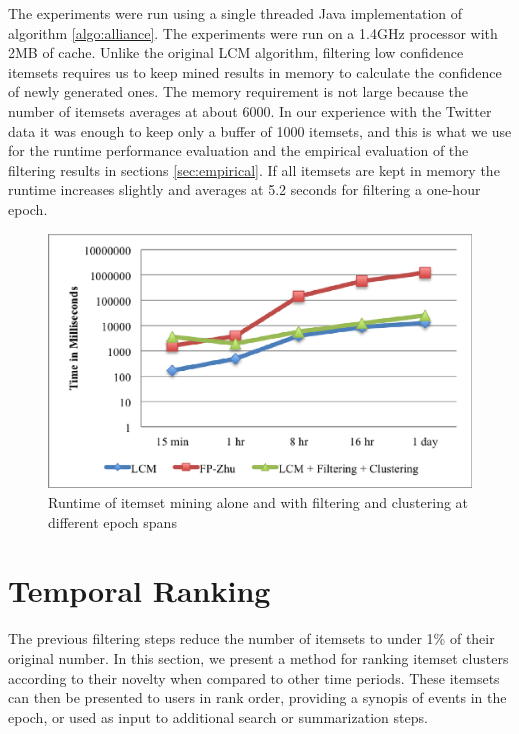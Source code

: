 \documentclass[letterpaper,12pt,titlepage,oneside,final]{book}
\begin{document}
The experiments were run using a single threaded Java implementation of
algorithm \ref{algo:alliance}.
The experiments were run on a 1.4GHz processor with 2MB of cache.
Unlike the original LCM algorithm, filtering low confidence itemsets requires
us to keep mined results in memory to calculate the confidence of newly
generated ones.
The memory requirement is not large because the number of itemsets averages
at about 6000.
In our experience with the Twitter data it was enough to keep only a buffer
of 1000 itemsets, and this is what we use for the runtime performance
evaluation and the empirical evaluation of the filtering results in
sections \ref{sec:empirical}.
If all itemsets are kept in memory the runtime increases slightly and
averages at 5.2 seconds for filtering a one-hour epoch.



\begin{figure}
\centering
\includegraphics{runtime_lcm-lcm+filter-fpzhu_seconds.eps}
\caption{Runtime of itemset mining alone and with filtering and clustering at different epoch spans}
\label{fig:lcmvsfpzhu}
\end{figure}


\section{Temporal Ranking}
\label{sec:rank}
The previous filtering steps reduce the number of itemsets to under 1\% of their
original number.
In this section, we present a method for ranking itemset clusters according to
their novelty when compared to other time periods.
These itemsets can then be presented to users in rank order, providing a
synopis of events in the epoch, or used as input to additional search or
summarization steps.
\end{document}
